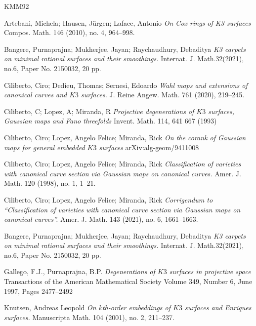 \documentclass[11pt,twoside]{amsart}
\theoremstyle{plain}
\numberwithin{equation}{section}
\theoremstyle{definition}
\begin{document}

\begin{thebibliography}{KMM92}
\color{black}

Artebani, Michela; Hausen, Jürgen; Laface, Antonio
\emph{On Cox rings of K3 surfaces}
Compos. Math. 146 (2010), no. 4, 964–998.

Bangere, Purnaprajna; Mukherjee, Jayan; Raychaudhury, Debaditya
\emph{K3 carpets on minimal rational surfaces and their smoothings.}
Internat. J. Math.32(2021), no.6, Paper No. 2150032, 20 pp.

Ciliberto, Ciro; Dedieu, Thomas; Sernesi, Edoardo
\emph{Wahl maps and extensions of canonical curves and $K3$ surfaces.}
J. Reine Angew. Math. 761 (2020), 219–245.


Ciliberto, C; Lopez, A; Miranda, R
\emph{Projective degenerations of $K3$ surfaces, Gaussian maps and Fano threefolds}
Invent. Math. 114, 641 667 (1993)

Ciliberto, Ciro; Lopez, Angelo Felice; Miranda, Rick
\emph{On the corank of Gaussian maps for general embedded $K3$ surfaces}
arXiv:alg-geom/9411008

Ciliberto, Ciro; Lopez, Angelo Felice; Miranda, Rick
\emph{Classification of varieties with canonical curve section via Gaussian maps on canonical curves.}
Amer. J. Math.   120 (1998), no. 1, 1–21.

Ciliberto, Ciro; Lopez, Angelo Felice; Miranda, Rick
\emph{Corrigendum to ``Classification of varieties with canonical curve section via Gaussian maps on canonical curves''.}
Amer. J. Math. 143 (2021), no. 6, 1661–1663.


Bangere, Purnaprajna; Mukherjee, Jayan; Raychaudhury, Debaditya
\emph{K3 carpets on minimal rational surfaces and their smoothings.}
Internat. J. Math.32(2021), no.6, Paper No. 2150032, 20 pp.

Gallego, F.J., Purnaprajna, B.P.
\emph{Degenerations of $K3$ surfaces in projective space}
Transactions of the American Mathematical Society
Volume 349, Number 6, June 1997, Pages 2477–2492

Knutsen, Andreas Leopold
\emph{On $k$th-order embeddings of $K3$ surfaces and Enriques surfaces.}
Manuscripta Math. 104 (2001), no. 2, 211–237.



\end{thebibliography}
\end{document}
